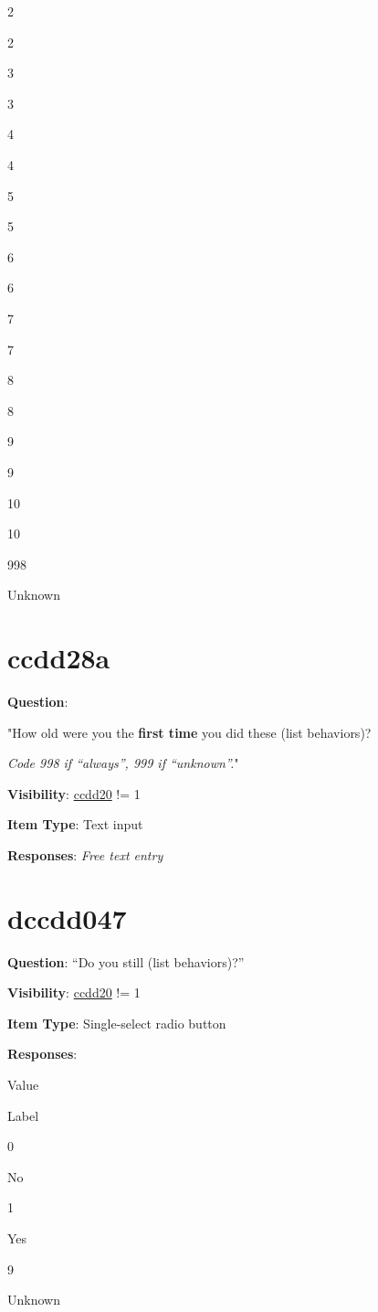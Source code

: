 \documentclass[]{book}
\begin{document}
2

2

3

3

4

4

5

5

6

6

7

7

8

8

9

9

10

10

998

Unknown

\hypertarget{ccdd28a}{%
\section{ccdd28a}\label{ccdd28a}}

\textbf{Question}:

"How old were you the \textbf{first time} you did these (list behaviors)?

\emph{Code 998 if ``always'', 999 if ``unknown''.}"

\textbf{Visibility}: \protect\hyperlink{ccdd20}{ccdd20} != 1

\textbf{Item Type}: Text input

\textbf{Responses}: \emph{Free text entry}

\hypertarget{dccdd047}{%
\section{dccdd047}\label{dccdd047}}

\textbf{Question}: ``Do you still (list behaviors)?''

\textbf{Visibility}: \protect\hyperlink{ccdd20}{ccdd20} != 1

\textbf{Item Type}: Single-select radio button

\textbf{Responses}:

Value

Label

0

No

1

Yes

9

Unknown
\end{document}
